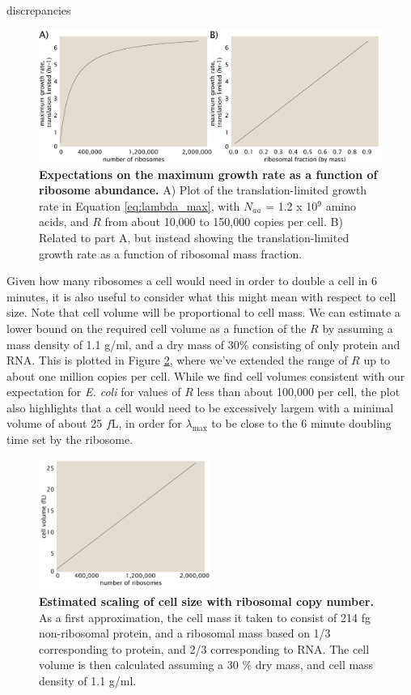 discrepancies \documentclass[11pt, letterpaper]{article}
\begin{document}
\begin{figure}[H]
		\centering
    \includegraphics[width=1\textwidth]{../../code/figures/SI/estimates_translation_toy_1.pdf}
  \caption{{\bf Expectations on the maximum growth rate as a function of ribosome abundance.}
	 	A) Plot of the translation-limited growth rate in Equation
	 	\ref{eq:lambda_max}, with $N_{aa}$ = 1.2 x 10$^9$ amino acids, and $R$ from about
	 	10,000 to 150,000 copies per cell. B) Related to part A, but instead
	 	showing the translation-limited growth rate as a function of ribosomal mass
	 	fraction.}
  \label{fig:estimates_translation_toy_1}
\end{figure}

Given how many ribosomes a cell would need in order to double a cell in 6 minutes,
it is also useful to consider what this might mean with
respect to cell size. Note that cell volume will be proportional to cell mass.
We can estimate a lower bound on the required cell volume as a function of the
$R$ by assuming a mass density of 1.1 g/ml, and a dry mass of 30\% consisting of
only protein and RNA. This is plotted in Figure
\ref{fig:estimates_translation_volume}, where we've extended the range of $R$ up
to about one million copies per cell. While we find cell volumes consistent with our expectation for {\it E. coli}
for values of $R$ less than about 100,000 per cell, the plot also highlights that a cell would need to be
excessively largem with a minimal volume of about 25 $f$L, in order for
$\lambda_{\text{max}}$ to be close to the 6 minute doubling time set by the ribosome.

\begin{figure}[H]
		\centering
    \includegraphics[width=0.5\textwidth]{../../code/figures/SI/estimates_translation_volume.pdf}
  \caption{{\bf Estimated scaling of cell size with ribosomal copy number.} As a first approximation,
	the cell mass it taken to consist of 214 fg non-ribosomal protein, and a ribosomal mass based
	on 1/3 corresponding to protein, and 2/3 corresponding to RNA. The cell volume is then calculated assuming
	a 30 \% dry mass, and cell mass density of 1.1 g/ml. }
  \label{fig:estimates_translation_volume}
\end{figure}
\end{document}
